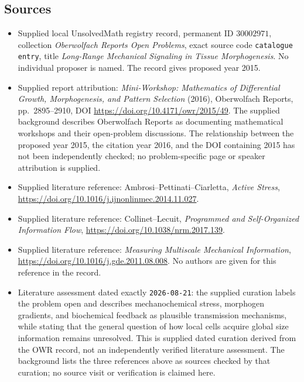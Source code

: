 \documentclass[11pt]{article}
\begin{document}
\subsection{Sources}
\begin{itemize}
\item Supplied local UnsolvedMath registry record, permanent ID \(30002971\), collection \emph{Oberwolfach Reports Open Problems}, exact source code \texttt{catalogue entry}, title \emph{Long-Range Mechanical Signaling in Tissue Morphogenesis}. No individual proposer is named. The record gives proposed year 2015.
\item Supplied report attribution: \emph{Mini-Workshop: Mathematics of Differential Growth, Morphogenesis, and Pattern Selection} (2016), Oberwolfach Reports, pp.\ 2895--2910, DOI \url{https://doi.org/10.4171/owr/2015/49}. The supplied background describes Oberwolfach Reports as documenting mathematical workshops and their open-problem discussions. The relationship between the proposed year 2015, the citation year 2016, and the DOI containing 2015 has not been independently checked; no problem-specific page or speaker attribution is supplied.
\item Supplied literature reference: Ambrosi--Pettinati--Ciarletta, \emph{Active Stress}, \url{https://doi.org/10.1016/j.ijnonlinmec.2014.11.027}.
\item Supplied literature reference: Collinet--Lecuit, \emph{Programmed and Self-Organized Information Flow}, \url{https://doi.org/10.1038/nrm.2017.139}.
\item Supplied literature reference: \emph{Measuring Multiscale Mechanical Information}, \url{https://doi.org/10.1016/j.gde.2011.08.008}. No authors are given for this reference in the record.
\item Literature assessment dated exactly \texttt{2026-08-21}: the supplied curation labels the problem open and describes mechanochemical stress, morphogen gradients, and biochemical feedback as plausible transmission mechanisms, while stating that the general question of how local cells acquire global size information remains unresolved. This is supplied dated curation derived from the OWR record, not an independently verified literature assessment. The background lists the three references above as sources checked by that curation; no source visit or verification is claimed here.
\end{itemize}
\end{document}
